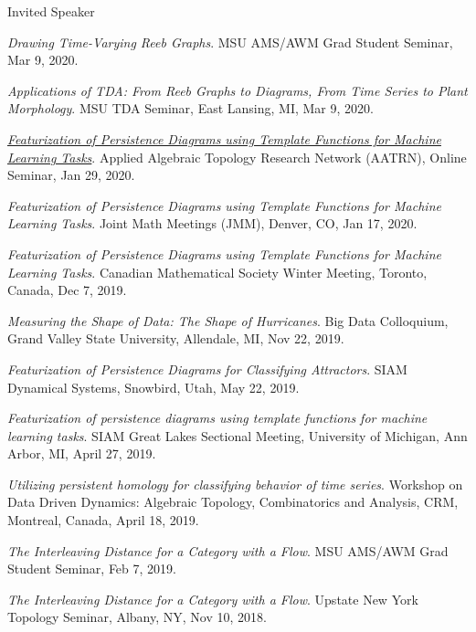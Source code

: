 \documentclass{resume} %
\begin{document}
\begin{rSection}{Invited Speaker}
\begin{etaremune}
\item\emph{Drawing Time-Varying Reeb Graphs}. MSU AMS/AWM Grad Student Seminar, Mar 9, 2020. 

\item\emph{Applications of TDA: From Reeb Graphs to Diagrams, From Time Series to Plant Morphology}. MSU TDA Seminar, East Lansing, MI, Mar 9, 2020. 

\item\emph{\href{https://youtu.be/Moh9lF4UVs4}{Featurization of Persistence Diagrams using Template Functions for Machine Learning Tasks}}. Applied Algebraic Topology Research Network (AATRN), Online Seminar, Jan 29, 2020. 

\item\emph{Featurization of Persistence Diagrams using Template Functions for Machine Learning Tasks}. Joint Math Meetings (JMM), Denver, CO, Jan 17, 2020. 

\item\emph{Featurization of Persistence Diagrams using Template Functions for Machine Learning Tasks}. Canadian Mathematical Society Winter Meeting, Toronto, Canada, Dec 7, 2019. 

\item\emph{Measuring the Shape of Data: The Shape of Hurricanes}. Big Data Colloquium, Grand Valley State University, Allendale, MI, Nov 22, 2019. 

\item\emph{Featurization of Persistence Diagrams for Classifying Attractors}. SIAM Dynamical Systems, Snowbird, Utah, May 22, 2019. 

\item\emph{Featurization of persistence diagrams using template functions for machine learning tasks}. SIAM Great Lakes Sectional Meeting, University of Michigan, Ann Arbor, MI, April 27, 2019. 

\item\emph{Utilizing persistent homology for classifying behavior of time series}. Workshop on Data Driven Dynamics: Algebraic Topology, Combinatorics and Analysis, CRM, Montreal, Canada, April 18, 2019. 

\item\emph{The Interleaving Distance for a Category with a Flow}. MSU AMS/AWM Grad Student Seminar, Feb 7, 2019. 

\item\emph{The Interleaving Distance for a Category with a Flow}. Upstate New York Topology Seminar, Albany, NY, Nov 10, 2018. 


\end{etaremune}
\end{rSection}
\end{document}
